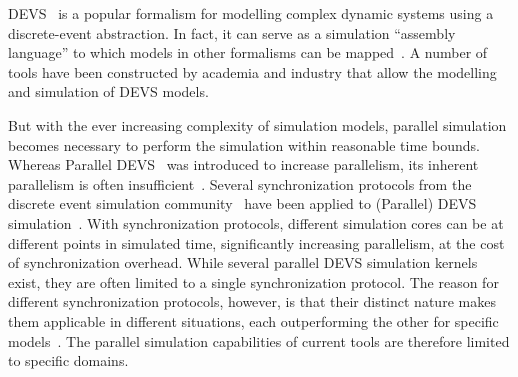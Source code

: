\textsf{DEVS}~\cite{ClassicDEVS} is a popular formalism for modelling complex dynamic systems using a discrete-event abstraction.
In fact, it can serve as a simulation ``assembly language'' to which models in other formalisms can be mapped~\cite{DEVSbase}.
A number of tools have been constructed by academia and industry that allow the modelling and simulation of \textsf{DEVS} models.

But with the ever increasing complexity of simulation models, parallel simulation becomes necessary to perform the simulation within reasonable time bounds.
Whereas \textsf{Parallel DEVS}~\cite{ParallelDEVS} was introduced to increase parallelism, its inherent parallelism is often insufficient~\cite{Himmelspach}.
Several synchronization protocols from the discrete event simulation community~\cite{FujimotoBook} have been applied to (\textsf{Parallel}) \textsf{DEVS} simulation~\cite{globaltimewarp}.
With synchronization protocols, different simulation cores can be at different points in simulated time, significantly increasing parallelism, at the cost of synchronization overhead.
While several parallel \textsf{DEVS} simulation kernels exist, they are often limited to a single synchronization protocol.
The reason for different synchronization protocols, however, is that their distinct nature makes them applicable in different situations, each outperforming the other for specific models~\cite{Jafer}.
The parallel simulation capabilities of current tools are therefore limited to specific domains.

